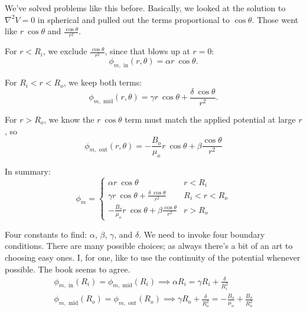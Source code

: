 \documentclass{article}
\numberwithin{equation}{section}
\begin{document}
We've solved problems like this before. Basically, we looked at the solution to $\nabla^2 V = 0$ in spherical and pulled out the terms proportional to $\cos{\theta}$. Those went like $r\ \cos{\theta}$ and $\displaystyle \frac{\cos{\theta}}{r^2}$.

For $r < R_i$, we exclude $\frac{\cos{\theta}}{r^2}$, since that blows up at $r = 0$:
\begin{equation*}
    \phi_{m, \text{ in}} (r, \theta) = \alpha r\ \cos{\theta}.
\end{equation*}

For $R_i < r < R_o$, we keep both terms:
\begin{equation*}
    \phi_{m, \text{ mid}} (r, \theta) = \gamma r\ \cos{\theta} + \frac{\delta\ \cos{\theta}}{r^2}.
\end{equation*}

For $r > R_o$, we know the $r\ \cos{\theta}$ term must match the applied potential at large $r$, so
\begin{equation*}
    \phi_{m, \text{ out}} (r, \theta) = -\frac{B_o}{\mu_o} r\ \cos{\theta} + \beta \frac{\cos{\theta}}{r^2}
\end{equation*}

In summary:
\begin{equation*}
    \phi_m = \begin{cases} \displaystyle \alpha r\ \cos{\theta} & r < R_i \\[0.5cm] \displaystyle \gamma r\ \cos{\theta} + \frac{\delta\ \cos{\theta}}{r^2} & R_i < r < R_o \\[0.5cm] \displaystyle -\frac{B_o}{\mu_o} r\ \cos{\theta} + \beta \frac{\cos{\theta}}{r^2} & r > R_o \end{cases}
\end{equation*}

Four constants to find: $\alpha$, $\beta$, $\gamma$, and $\delta$. We need to invoke four boundary conditions. There are many possible choices; as always there's a bit of an art to choosing easy ones. I, for one, like to use the continuity of the potential whenever possible. The book seems to agree.
\begin{gather*}
    \phi_{m, \text{ in}} (R_i) = \phi_{m, \text{ mid}} (R_i) \implies \alpha R_i = \gamma R_i + \frac{\delta}{R_i^2} \\
    \phi_{m, \text{ mid}} (R_o) = \phi_{m, \text{ out}} (R_o) \implies \gamma R_o + \frac{\delta}{R_o^2} = -\frac{B_o}{\mu_o} + \frac{B_o}{R_o^2}
\end{gather*}
\end{document}
